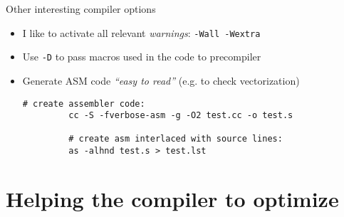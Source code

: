 \documentclass[10pt,xcolor=table]{beamer}
\begin{document}
\begin{frame}[fragile]{Other interesting compiler options}

  \begin{itemize}
  \item I like to activate all relevant \emph{warnings}: {\tt -Wall
      -Wextra}
  \item Use {\tt -D} to pass macros used in the code to precompiler

    \pause

  \item Generate ASM code \emph{``easy to read''} (e.g. to check
    vectorization)
        \begin{lstlisting}[style=shell,gobble=5,caption={From the book
\emph{Algorithms for programmers}\footnote<2>{Algorithms for programmers:
\url{https://www.jjj.de/fxt}}\footnote<2>{Generating Mixed
Source and Assembly List using GCC: {\scriptsize \url{http://www.systutorials.com/240/generate-a-mixed-source-and-assembly-listing-using-gcc}}}}]
         # create assembler code:
         cc -S -fverbose-asm -g -O2 test.cc -o test.s

         # create asm interlaced with source lines:
         as -alhnd test.s > test.lst
       \end{lstlisting}
  \end{itemize}

\end{frame}


\section{Helping the compiler to optimize}
\end{document}
